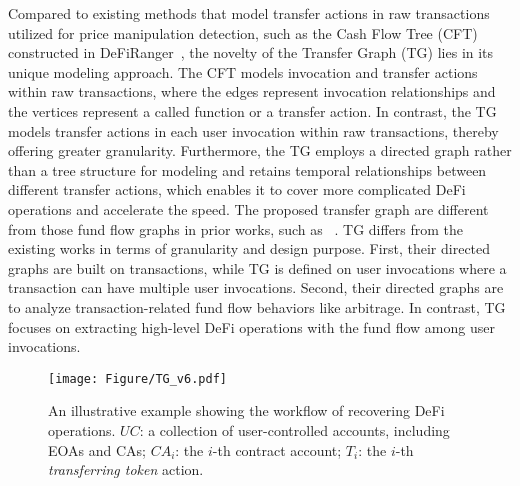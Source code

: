 Compared to existing methods that model transfer actions in raw transactions utilized {for price manipulation detection}, such as the Cash Flow Tree (CFT) constructed in DeFiRanger~\cite{DeFiRanger23}, the novelty of the Transfer Graph (TG) lies in its unique modeling approach.
The CFT models invocation and transfer actions within raw transactions, where the edges represent invocation relationships and the vertices represent a called function or a transfer action.
In contrast, the TG models transfer actions in each user invocation within raw transactions, thereby offering greater granularity.
Furthermore, the TG employs a directed graph rather than a tree structure for modeling and retains temporal relationships between different transfer actions, which enables it to cover more complicated DeFi operations and accelerate the speed. %
{The proposed transfer graph are different from those fund flow graphs in prior works, such as ~\cite{mclaughlin2023large}.
TG differs from the existing works in terms of granularity and design purpose.
First, their directed graphs are built on transactions, while TG is defined on user invocations where a transaction can have multiple user invocations. 
Second, their directed graphs are to analyze transaction-related fund flow behaviors like arbitrage. 
In contrast, TG focuses on extracting high-level DeFi operations with the fund flow among user invocations.}



\begin{figure}[!t]
    \centering
    \texttt{[image: Figure/TG\_v6.pdf]}
    \caption{An illustrative example showing the workflow of recovering DeFi operations. $UC$: a collection of user-controlled accounts, including EOAs and CAs; $CA_i$: the $i$-th contract account; $T_i$: the $i$-th \textit{transferring token} action.}
    \label{fig:TG}
\end{figure}



